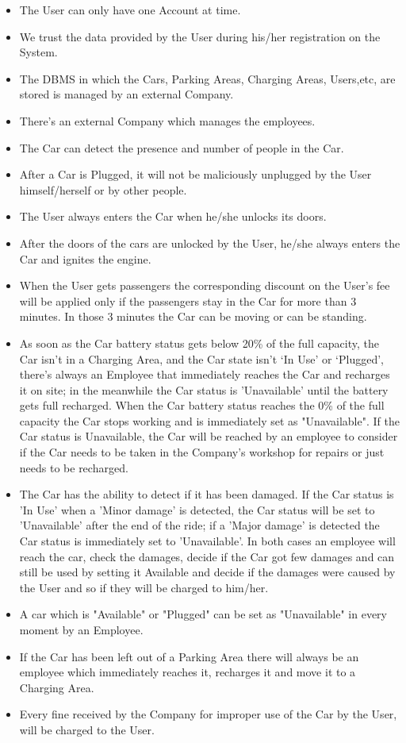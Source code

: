 \begin{itemize}
	\item The User can only have one Account at time.
	\item We trust the data provided by the User during his/her registration on the System.
	\item The DBMS in which the Cars, Parking Areas, Charging Areas, Users,etc, are stored is managed by an external Company.
	\item There's an external Company which manages the employees.
	\item The Car can detect the presence and number of people in the Car.
	\item After a Car is Plugged, it will not be maliciously unplugged by the User himself/herself or by other people.
	\item The User always enters the Car when he/she unlocks its doors.
	\item After the doors of the cars are unlocked by the User, he/she always enters the Car and ignites the engine.
	\item When the User gets passengers the corresponding discount on the User's fee will be applied only if the passengers stay in the Car for more than 3 minutes. In those 3 minutes the Car can be moving or can be standing.
	\item As soon as the Car battery status gets below 20\% of the full capacity, the Car isn't in a Charging Area, and the Car state isn't ‘In Use' or ‘Plugged', there's always an Employee that immediately reaches the Car and recharges it on site; in the meanwhile the Car status is 'Unavailable' until the battery gets full recharged.
	When the Car battery status reaches the 0\% of the full capacity the Car stops working and is immediately set as "Unavailable".
	If the Car status is Unavailable, the Car will be reached by an employee to consider if the Car needs to be taken in the Company's workshop for repairs or just needs to be recharged.
	\item The Car has the ability to detect if it has been damaged. If the Car status is 'In Use' when a 'Minor damage' is detected, the Car status will be set to 'Unavailable' after the end of the ride; if a 'Major damage' is detected the Car status is immediately set to 'Unavailable'. In both cases an employee will reach the car, check the damages, decide if the Car got few damages and can still be used by setting it Available and decide if the damages were caused by the User and so if they will be charged to him/her. 
	\item A car which is "Available" or "Plugged" can be set as "Unavailable" in every moment by an Employee. 
	\item If the Car has been left out of a Parking Area there will always be an employee which immediately reaches it, recharges it and move it to a Charging Area. 
	\item Every fine received by the Company for improper use of the Car by the User, will be charged to the User.
\end{itemize}